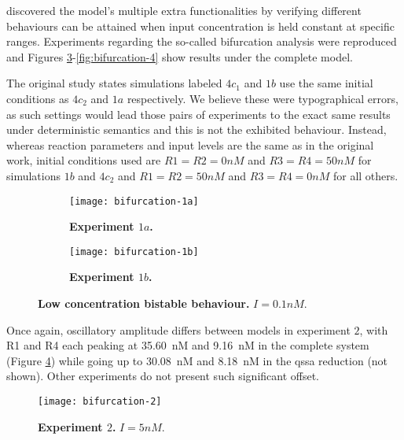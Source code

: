     \citet{multif} discovered the model's multiple extra functionalities by verifying different behaviours can be attained when input concentration is held constant at specific ranges.
    Experiments regarding the so-called bifurcation analysis were reproduced and Figures \ref{fig:bifurcation-1}-\ref{fig:bifurcation-4} show results under the complete model.

    The original study states simulations labeled $4c_{1}$ and $1b$ use the same initial conditions as $4c_{2}$ and $1a$ respectively.
    We believe these were typographical errors, as such settings would lead those pairs of experiments to the exact same results under deterministic semantics and this is not the exhibited behaviour.
    Instead, whereas reaction parameters and input levels are the same as in the original work, initial conditions used are $R1=R2=0nM$ and $R3=R4=50nM$ for simulations $1b$ and $4c_{2}$ and $R1=R2=50nM$ and $R3=R4=0nM$ for all others.

    \begin{figure}[!htbp]
      \centering
      \begin{subfigure}[t]{0.85\textwidth}
        \centering
        \texttt{[image: bifurcation-1a]}
        \caption{\textbf{Experiment $1a$.}}
        \label{fig:bifurcation-1a}
      \end{subfigure}
      \begin{subfigure}[t]{0.85\textwidth}
        \centering
        \texttt{[image: bifurcation-1b]}
        \caption{\textbf{Experiment $1b$.}}
        \label{fig:bifurcation-1b}
      \end{subfigure}
      \caption{\textbf{Low concentration bistable behaviour.} $I = 0.1 nM$.}
      \label{fig:bifurcation-1}
    \end{figure}

    Once again, oscillatory amplitude differs between models in experiment $2$, with R1 and R4 each peaking at \SI{35.60}{\nano M} and \SI{9.16}{\nano M} in the complete system (Figure \ref{fig:bifurcation-2}) while going up to \SI{30.08}{\nano M} and \SI{8.18}{\nano M} in the \ac{qssa} reduction (not shown).
    Other experiments do not present such significant offset.

    \begin{figure}[!htbp]
      \centering
      \texttt{[image: bifurcation-2]}
      \caption{\textbf{Experiment $2$.} $I = 5 nM$.}
      \label{fig:bifurcation-2}
    \end{figure}

